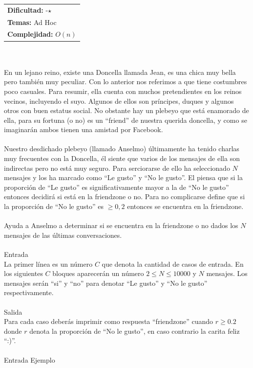 \documentclass[12pt]{article}
\begin{document}
{{{\hfill
\begin{tabular}{@{}l@{}}
\textbf{Dificultad:} -$\star$ \\
\textbf{Temas:} Ad Hoc \\
\textbf{Complejidad:} $O(n)$
\end{tabular}
\\
\\En un lejano reino, existe una Doncella llamada Jean, es una chica muy bella pero también muy peculiar. Con lo anterior nos referimos a que tiene costumbres poco casuales. Para resumir, ella cuenta con muchos pretendientes en los reinos vecinos, incluyendo el suyo. Algunos de ellos son príncipes, duques y algunos otros con buen estatus social. No obstante hay un plebeyo que está enamorado de ella, para su fortuna (o no) es un “friend” de nuestra querida doncella, y como se imaginarán ambos tienen una amistad por Facebook.\\
\\Nuestro desdichado plebeyo (llamado Anselmo) últimamente ha tenido charlas muy frecuentes con la Doncella, él siente que varios de los mensajes de ella son indirectas pero no está muy seguro. Para serciorarse de ello ha seleccionado $N$ mensajes y los ha marcado como “Le gusto” y “No le gusto”. El piensa que si la proporción de “Le gusto” es significativamente mayor a la de “No le gusto” entonces decidirá si está en la friendzone o no. Para no complicarse define que si la proporción de “No le gusto” es $≥ 0,2$ entonces se encuentra en la friendzone.\\
\\Ayuda a Anselmo a determinar si se encuentra en la friendzone o no dados los $N$ mensajes de las últimas conversaciones.
\\
\\
\textrm{\large Entrada}
\\
La primer línea es un número $C$ que denota la cantidad de casos de entrada. En los siguientes $C$ bloques aparecerán un número $2 ≤ N ≤ 10000$ y $N$ mensajes. Los mensajes serán “si” y “no” para denotar “Le gusto” y “No le gusto” respectivamente.
\\
\\
\textrm{\large Salida}
\\
Para cada caso deberás imprimir como respuesta “friendzone” cuando $r ≥ 0.2$ donde $r$ denota la proporción de “No le gusto”, en caso contrario la carita feliz “:)”.
\\
\\
\textrm{\large Entrada Ejemplo}
\\
}}}
\end{document}
